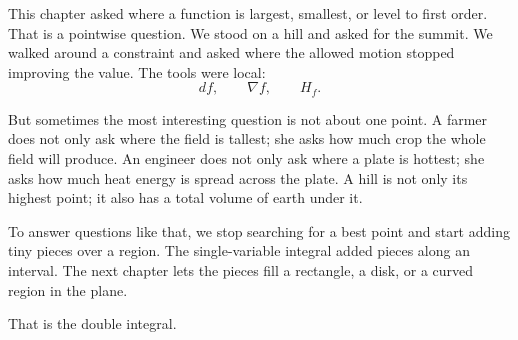 This chapter asked where a function is largest, smallest, or level to first order.  That is a
pointwise question.  We stood on a hill and asked for the summit.  We walked around a
constraint and asked where the allowed motion stopped improving the value.  The tools
were local:
\[
    df,
    \qquad
    \nabla f,
    \qquad
    H_f.
\]

But sometimes the most interesting question is not about one point.  A farmer does not
only ask where the field is tallest; she asks how much crop the whole field will produce.
An engineer does not only ask where a plate is hottest; she asks how much heat energy is
spread across the plate.  A hill is not only its highest point; it also has a total volume of
earth under it.

To answer questions like that, we stop searching for a best point and start adding tiny
pieces over a region.  The single-variable integral added pieces along an interval.  The
next chapter lets the pieces fill a rectangle, a disk, or a curved region in the plane.

That is the double integral.